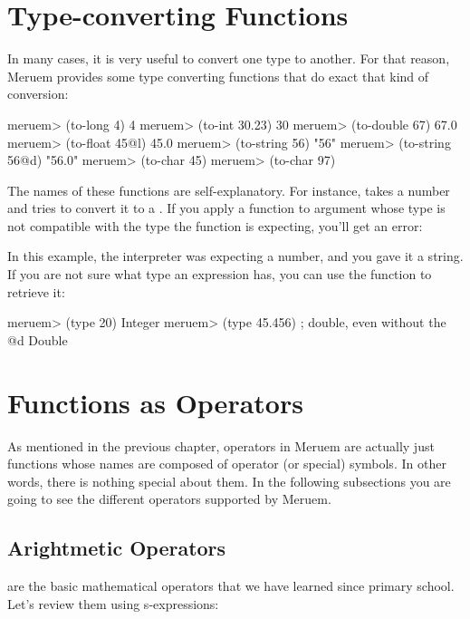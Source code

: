 \section{Type-converting Functions}
In many cases, it is very useful to convert one type to another. For that reason, Meruem provides some type converting functions that do exact that kind of conversion:

\begin{REPL}
meruem> (to-long 4)
4
meruem> (to-int 30.23)  
30
meruem> (to-double 67)
67.0
meruem> (to-float 45@l)
45.0
meruem> (to-string 56)
"56"
meruem> (to-string 56@d)
"56.0"
meruem> (to-char 45)
\-
meruem> (to-char 97)
\a
\end{REPL}

The names of these functions are self-explanatory. For instance,  takes a number and tries to convert it to a . If you apply a function to argument whose type is not compatible with the type the function is expecting, you'll get an error:

\begin{REPL}
meruem> (to-char "the")
An error has occurred. Invalid Type. Not a Number: the
Source: .home.melvic.meruem.meruem.prelude [1:10}]
(to-char "the")
         ^
\end{REPL}

In this example, the interpreter was expecting a number, and you gave it a string. If you are not sure what type an expression has, you can use the  function to retrieve it:

\begin{REPL}
meruem> (type 20)
Integer
meruem> (type 45.456)  ; double, even without the @d
Double
\end{REPL}

\section{Functions as Operators}
As mentioned in the previous chapter, operators in Meruem are actually just functions whose names are composed of operator (or special) symbols. In other words, there is nothing special about them. In the following subsections you are going to see the different operators supported by Meruem.

\subsection{Arightmetic Operators}
 are the basic mathematical operators that we have learned since primary school. Let's review them using s-expressions:

